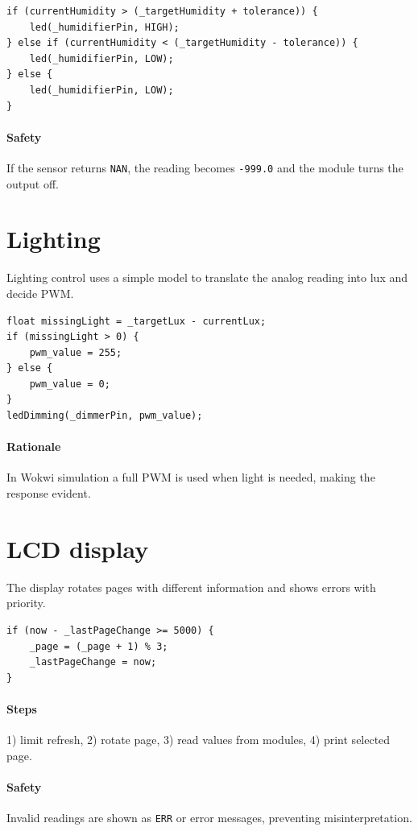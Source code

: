 \begin{lstlisting}[style=cppstyle]
if (currentHumidity > (_targetHumidity + tolerance)) {
    led(_humidifierPin, HIGH);
} else if (currentHumidity < (_targetHumidity - tolerance)) {
    led(_humidifierPin, LOW);
} else {
    led(_humidifierPin, LOW);
}
\end{lstlisting}

\paragraph{Safety} If the sensor returns \texttt{NAN}, the reading becomes \texttt{-999.0} and the module turns the output off.

\section{Lighting}
Lighting control uses a simple model to translate the analog reading into lux and decide PWM.

\begin{lstlisting}[style=cppstyle]
float missingLight = _targetLux - currentLux;
if (missingLight > 0) {
    pwm_value = 255;
} else {
    pwm_value = 0;
}
ledDimming(_dimmerPin, pwm_value);
\end{lstlisting}

\paragraph{Rationale} In Wokwi simulation a full PWM is used when light is needed, making the response evident.

\section{LCD display}
The display rotates pages with different information and shows errors with priority.

\begin{lstlisting}[style=cppstyle]
if (now - _lastPageChange >= 5000) {
    _page = (_page + 1) % 3;
    _lastPageChange = now;
}
\end{lstlisting}

\paragraph{Steps} 1) limit refresh, 2) rotate page, 3) read values from modules, 4) print selected page.

\paragraph{Safety} Invalid readings are shown as \texttt{ERR} or error messages, preventing misinterpretation.
